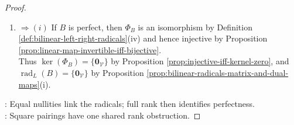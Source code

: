 \begin{proposition}
\begin{proof}
\begin{enumerate}[label=(\roman*)]
\item[$(iv)$] $\Rightarrow (i)$ If $B$ is perfect, then $\Phi_B$ is an isomorphism by Definition \ref{def:bilinear-left-right-radicals}(iv) and hence injective by Proposition \ref{prop:linear-map-invertible-iff-bijective}.\\
Thus $\ker(\Phi_B)=\{\mathbf{0}_{\mathcal{V}}\}$ by Proposition \ref{prop:injective-iff-kernel-zero}, and $\operatorname{rad}_{L}(B)=\{\mathbf{0}_{\mathcal{V}}\}$ by Proposition \ref{prop:bilinear-radicals-matrix-and-dual-maps}(i).
\end{enumerate}
: Equal nullities link the radicals; full rank then identifies perfectness.\\
: Square pairings have one shared rank obstruction.
\end{proof}
\end{proposition}

